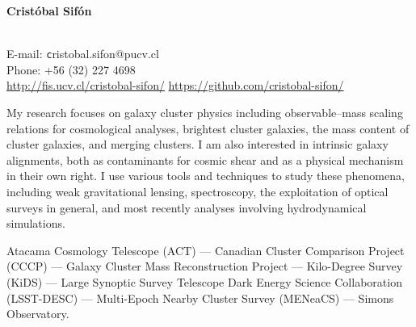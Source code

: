 \documentclass[11pt]{article}
\begin{document}
\begin{minipage}[b]{0.46\linewidth}
\flushleft
\hspace{-0.7cm}
{\bf\huge Crist\'obal Sif\'on}\\\vspace{0.2cm}
\\
\end{minipage}
\begin{minipage}[b]{0.49\linewidth}
\flushright
{\large E-mail: {\texttt cristobal.sifon@pucv.cl}\\
        Phone: +56 (32) 227 4698\\
        \url{http://fis.ucv.cl/cristobal-sifon/}
        \url{https://github.com/cristobal-sifon/}}
\end{minipage}
\vspace{0.4cm}
\hline




My research focuses on galaxy cluster physics including observable--mass scaling 
relations for cosmological analyses, brightest cluster galaxies, the mass 
content of cluster galaxies, and merging clusters. I am also interested in 
intrinsic galaxy alignments, both as contaminants for cosmic shear and as a 
physical mechanism in their own right. I use various tools and techniques to 
study these phenomena, including weak gravitational lensing, spectroscopy, the 
exploitation of optical surveys in general, and most recently analyses involving 
hydrodynamical simulations.

\vspace{0.5cm}
{
 Atacama Cosmology Telescope (ACT) ---
 Canadian Cluster Comparison Project (CCCP) ---
 Galaxy Cluster Mass Reconstruction Project ---
 Kilo-Degree Survey (KiDS) ---
 Large Synoptic Survey Telescope Dark Energy Science Collaboration (LSST-DESC) ---
 Multi-Epoch Nearby Cluster Survey (MENeaCS) ---
 Simons Observatory.
}
\end{document}
